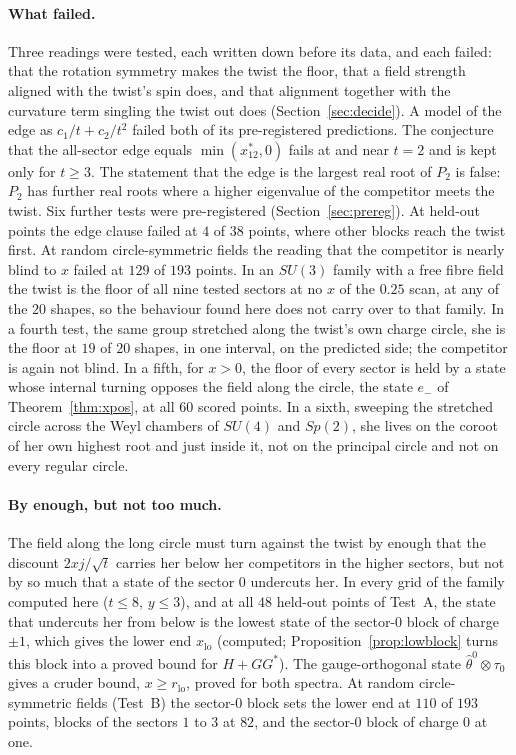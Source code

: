 \documentclass[11pt]{article}
\theoremstyle{definition}
\theoremstyle{remark}
\begin{document}
\paragraph{What failed.} Three readings were tested, each written down before its data, and each failed: that the
rotation symmetry makes the twist the floor, that a field strength aligned with the twist's spin does, and that
alignment together with the curvature term singling the twist out does (Section~\ref{sec:decide}). A model of the
edge as $c_1/t+c_2/t^2$ failed both of its pre-registered predictions. The conjecture that the all-sector edge equals
$\min(x^*_{12},0)$ fails at and near $t=2$ and is kept only for $t\ge3$. The statement that the edge is the largest
real root of $P_2$ is false: $P_2$ has further real roots where a higher eigenvalue of the competitor meets the twist.
Six further tests were pre-registered (Section~\ref{sec:prereg}). At held-out points the edge clause failed at $4$ of
$38$ points, where other blocks reach the twist first. At random circle-symmetric fields the reading that the competitor
is nearly blind to $x$ failed at $129$ of $193$ points. In an $SU(3)$ family with a free fibre field the twist is the
floor of all nine tested sectors at no $x$ of the $0.25$ scan, at any of the $20$ shapes, so the behaviour found here
does not carry over to that family. In a fourth test, the same group stretched along the twist's own charge circle,
she is the floor at $19$ of $20$ shapes, in one interval, on the predicted side; the competitor is again not blind. In
a fifth, for $x>0$, the floor of every sector is held by a state whose internal turning opposes the field along the
circle, the state $e_-$ of Theorem~\ref{thm:xpos}, at all $60$ scored points. In a sixth, sweeping the stretched circle across the Weyl chambers of $SU(4)$ and $Sp(2)$, she lives on the coroot of her
own highest root and just inside it, not on the principal circle and not on every regular circle.

\paragraph{By enough, but not too much.} The field along the long circle must turn against the twist by enough that
the discount $2xj/\sqrt t$ carries her below her competitors in the higher sectors, but not by so much that a state of
the sector $0$ undercuts her. In every grid of the family computed here ($t\le8$, $y\le3$), and at all $48$ held-out points of
Test~A, the state that undercuts her from below is the lowest state of the sector-$0$ block of charge $\pm1$, which gives the
lower end $x_{\mathrm{lo}}$ (computed; Proposition~\ref{prop:lowblock} turns this block into a proved bound for
$H+GG^*$). The gauge-orthogonal state $\hat\theta^0\otimes\tau_0$ gives a cruder bound, $x\ge r_{\mathrm{lo}}$, proved
for both spectra. At random circle-symmetric fields (Test~B) the sector-$0$ block sets the lower end at $110$ of $193$
points, blocks of the sectors $1$ to $3$ at $82$, and the sector-$0$ block of charge $0$ at one.
\end{document}
